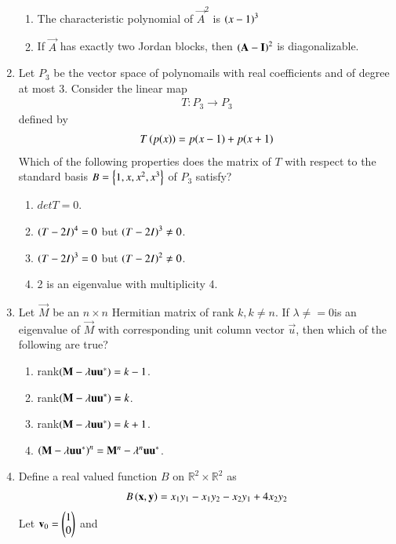 \begin{enumerate}[label=\thesection.\arabic*.,ref=\thesection.\theenumi]
\begin{enumerate}
\item  The characteristic polynomial of  $\vec{A}^2$ is $\left(x-1\right)^3$
\item If $\vec{A}$ has exactly two Jordan blocks, then $\left(\mathbf{A}-\mathbf{I}\right)^2$ is diagonalizable. 
\end{enumerate}
\solution

%
\item Let $P_3$ be the vector space of polynomails with real coefficients and of degree at most 3.  Consider the linear map
\begin{align}
T:P_3\to P_3
\end{align}
defined by 
\begin{align}
T\left(p(x)\right) = p(x-1)+p(x+1)
\end{align}
%
Which of the following properties does the matrix of $T$ with respect to the standard basis
$B = \left\{1,x,x^2,x^3\right\}$ of $P_3$ satisfy?
\begin{enumerate}
\item $det T = 0$.
\item $\left(T-2I\right)^4 = 0$ but $\left(T-2I\right)^3 \ne 0$.
\item $\left(T-2I\right)^3 = 0$ but $\left(T-2I\right)^2 \ne 0$.
\item 2 is an eigenvalue with multiplicity 4.
\end{enumerate}
%
\solution

\item Let $\vec{M}$ be an $n \times n$ Hermitian matrix of rank $k, k \ne n$.  If $\lambda \ne = 0$is an eigenvalue of $\vec{M}$ with corresponding unit column vector $\vec{u}$, then which of the
following are true?
\begin{enumerate}
\item rank$\left(\mathbf{M}- \lambda \mathbf{u}\mathbf{u}^*\right) = k-1$.
\item rank$\left(\mathbf{M}- \lambda \mathbf{u}\mathbf{u}^*\right) = k$.
\item rank$\left(\mathbf{M}- \lambda \mathbf{u}\mathbf{u}^*\right) = k+1$.
\item $\left(\mathbf{M}- \lambda \mathbf{u}\mathbf{u}^*\right)^n = \mathbf{M}^n - \lambda^n \mathbf{u}\mathbf{u}^*$.
\end{enumerate}
%
\solution

\item Define a real valued function $B$ on $\mathbb{R}^2 \times \mathbb{R}^2 $ as 
\begin{align}
B\left(\mathbf{x},\mathbf{y}\right) = x_1y_1 - x_1y_2-x_2y_1+4x_2y_2
\end{align}
Let $\mathbf{v}_0 = \begin{pmatrix}1\\0\end{pmatrix}$ and 

\end{enumerate}
